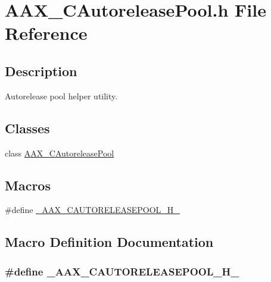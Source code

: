 \hypertarget{a00165}{}\section{A\+A\+X\+\_\+\+C\+Autorelease\+Pool.\+h File Reference}
\label{a00165}


\subsection{Description}
Autorelease pool helper utility. 

\subsection*{Classes}
\begin{DoxyCompactItemize}
\item 
class \hyperlink{a00011}{A\+A\+X\+\_\+\+C\+Autorelease\+Pool}
\end{DoxyCompactItemize}
\subsection*{Macros}
\begin{DoxyCompactItemize}
\item 
\#define \hyperlink{a00165_ab8081ca091051bda29f018e9cc578a5a}{\+\_\+\+A\+A\+X\+\_\+\+C\+A\+U\+T\+O\+R\+E\+L\+E\+A\+S\+E\+P\+O\+O\+L\+\_\+\+H\+\_\+}
\end{DoxyCompactItemize}


\subsection{Macro Definition Documentation}
\hypertarget{a00165_ab8081ca091051bda29f018e9cc578a5a}{}
\subsubsection[{\+\_\+\+A\+A\+X\+\_\+\+C\+A\+U\+T\+O\+R\+E\+L\+E\+A\+S\+E\+P\+O\+O\+L\+\_\+\+H\+\_\+}]{\setlength{\rightskip}{0pt plus 5cm}\#define \+\_\+\+A\+A\+X\+\_\+\+C\+A\+U\+T\+O\+R\+E\+L\+E\+A\+S\+E\+P\+O\+O\+L\+\_\+\+H\+\_\+}\label{a00165_ab8081ca091051bda29f018e9cc578a5a}
